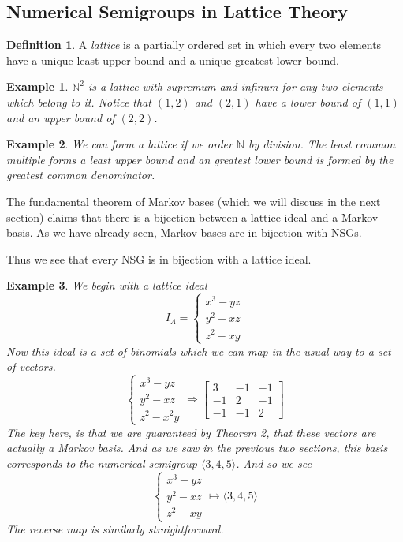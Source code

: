 \documentclass[11pt]{amsart}
\theoremstyle{plain}
\newtheorem{exa}{Example}
\theoremstyle{definition}
\newtheorem{defi}{Definition}
\begin{document}
\subsection{Numerical Semigroups in Lattice Theory}
\begin{defi}
\cite{stanley}
A \emph{lattice} is a partially ordered set in which every two elements have a
unique least upper bound and a unique greatest lower bound.
\end{defi}
\begin{exa}
$\mathbb{N}^2$ is a lattice with supremum and infinum for any two elements which
belong to it. Notice that $(1,2)$ and $(2,1)$ have a lower bound of $(1,1)$ and
an upper bound of $(2,2)$.
\end{exa}
\begin{exa}
We can form a lattice if we order $\mathbb{N}$ by division. The least common
multiple forms a least upper bound and an greatest lower bound is formed by the
greatest common denominator.
\end{exa}
The fundamental theorem of Markov bases (which we will discuss in the next section)
claims that there is a bijection between a lattice ideal and a Markov basis. As
we have already seen, Markov bases are in bijection with NSGs.

Thus we see that every NSG is in bijection with a lattice ideal.

\begin{exa}
  We begin with a lattice ideal
  \[
  I_\Lambda=
  \begin{cases}
    x^3-yz\\
    y^2-xz\\
    z^2-xy
  \end{cases}
  \]
  Now this ideal is a set of binomials which we can map in the usual way to a set
  of vectors.
  \[
  \begin{cases}
    x^3-yz\\
    y^2-xz\\
    z^2-x^2y
  \end{cases}
  \Rightarrow
  \left[\begin{array}{rrr}
    3&-1&-1\\
    -1&2&-1\\
    -1&-1&2
  \end{array}\right]
  \]
  The key here, is that we are guaranteed by Theorem 2, that these vectors are
  actually a Markov basis. And as we saw in the previous two sections, this basis
  corresponds to the numerical semigroup $\langle 3,4,5\rangle$. And so we see
  \[
  \begin{cases}
    x^3-yz\\
    y^2-xz\\
    z^2-xy
  \end{cases}
  \mapsto\langle 3,4,5\rangle
  \]
  The reverse map is similarly straightforward.
\end{exa}
\end{document}
